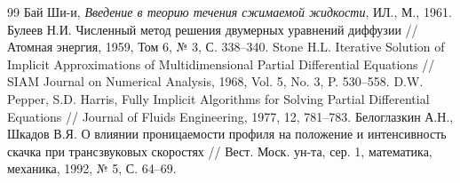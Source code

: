 	\begin{thebibliography}{99}
		 Бай Ши-и, \textit{Введение в теорию течения сжимаемой жидкости}, ИЛ., М., 1961.
		 Булеев Н.И. Численный метод решения двумерных уравнений диффузии // Атомная энергия, 1959, Том 6, № 3, С. 338–340.
		 Stone H.L. Iterative Solution of Implicit Approximations of Multidimensional Partial Differential Equations // SIAM Journal on Numerical Analysis, 1968, Vol. 5, No. 3, P. 530–558.
		 D.W. Pepper, S.D. Harris, Fully Implicit Algorithms for Solving Partial Differential Equations // Journal of Fluids Engineering, 1977, 12, 781–783.
		 Белоглазкин А.Н., Шкадов В.Я. О влиянии проницаемости профиля на положение и интенсивность скачка при трансзвуковых скоростях // Вест. Моск. ун-та, сер. 1, математика, механика, 1992, № 5, С. 64–69.
	\end{thebibliography}
	\newpage
